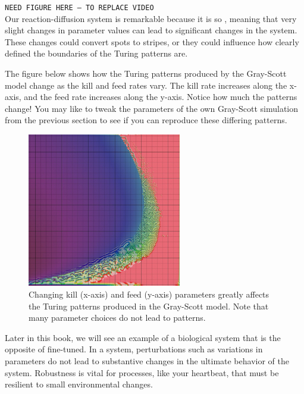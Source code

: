 {{\texttt{NEED FIGURE HERE -- TO REPLACE VIDEO}\\

Our reaction-diffusion system is remarkable because it is so , meaning that very slight changes in parameter values can lead to significant changes in the system. These changes could convert spots to stripes, or they could influence how clearly defined the boundaries of the Turing patterns are.

The figure below shows how the Turing patterns produced by the Gray-Scott model change as the kill and feed rates vary. The kill rate increases along the x-axis, and the feed rate increases along the y-axis. Notice how much the patterns change! You may like to tweak the parameters of the own Gray-Scott simulation from the previous section to see if you can reproduce these differing patterns.

\begin{figure}[h]
\centering
\mySfFamily
\includegraphics[width = 0.6\textwidth]{../images/xmorphia-parameter-map.jpg}
\caption{Changing kill (x-axis) and feed (y-axis) parameters greatly affects the Turing patterns produced in the Gray-Scott model. Note that many parameter choices do not lead to patterns.}
\label{fig:xmorphia-parameter-map}
\end{figure}

Later in this book, we will see an example of a biological system that is the opposite of fine-tuned. In a  system, perturbations such as variations in parameters do not lead to substantive changes in the ultimate behavior of the system. Robustness is vital for processes, like your heartbeat, that must be resilient to small environmental changes.

}}
